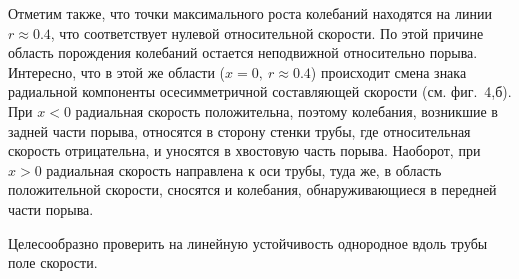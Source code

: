 Отметим также, что точки максимального роста колебаний находятся на линии $r\approx0.4$, что соответствует нулевой относительной скорости. По этой причине область порождения колебаний остается неподвижной относительно порыва. Интересно, что в этой же области ($x=0,\ r\approx0.4$) происходит смена знака радиальной компоненты осесимметричной составляющей скорости (см. фиг.~4,б). При $x<0$ радиальная скорость положительна, поэтому колебания, возникшие в задней части порыва, относятся в сторону стенки трубы, где относительная скорость отрицательна, и уносятся в хвостовую часть порыва. Наоборот, при $x>0$ радиальная скорость направлена к оси трубы, туда же, в область положительной скорости, сносятся и колебания, обнаруживающиеся в передней части порыва.

Целесообразно проверить на линейную устойчивость однородное вдоль трубы поле скорости. 


